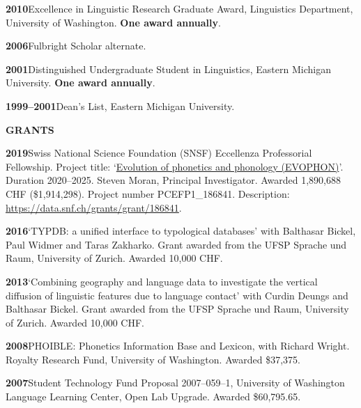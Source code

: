 \documentclass[11pt]{article}
\newcommand{\hangpara}{
 \setlength{\parindent}{0in} %
 \hangindent=0.42in %
}
\begin{document}
\vskip 6pt
\hangpara
{\bf 2010}\hspace{1ex}Excellence in Linguistic Research Graduate Award, Linguistics Department, University of Washington. \textbf{One award annually}.

\vskip 6pt
\hangpara
{\bf 2006}\hspace{1ex}Fulbright Scholar alternate.

\vskip 6pt
\hangpara
{\bf 2001}\hspace{1ex}Distinguished Undergraduate Student in Linguistics, Eastern Michigan University. \textbf{One award annually}.

\vskip 6pt
\hangpara
{\bf 1999--2001}\hspace{1ex}Dean's List, Eastern Michigan University.


\vskip 20pt
\begin{flushleft}
{\bf GRANTS}
\end{flushleft}


\hangpara
{\bf 2019}\hspace{1ex}Swiss National Science Foundation (SNSF) Eccellenza Professorial Fellowship. Project title: `\href{http://p3.snf.ch/project-186841}{Evolution of phonetics and phonology (EVOPHON)}'. Duration 2020--2025. Steven Moran, Principal Investigator. Awarded 1,890,688 CHF (\$1,914,298). Project number PCEFP1\_186841. Description: \url{https://data.snf.ch/grants/grant/186841}.

\vskip 6pt
\hangpara
{\bf 2016}\hspace{1ex}`TYPDB: a unified interface to typological databases' with Balthasar Bickel, Paul Widmer and Taras Zakharko. Grant awarded from the UFSP Sprache und Raum, University of Zurich. Awarded 10,000 CHF.

\vskip 6pt
\hangpara
{\bf 2013}\hspace{1ex}`Combining geography and language data to investigate the vertical diffusion of linguistic features due to language contact' with Curdin Deungs and Balthasar Bickel. Grant awarded from the UFSP Sprache und Raum, University of Zurich. Awarded 10,000 CHF.

\vskip 6pt
\hangpara
{\bf 2008}\hspace{1ex}PHOIBLE: Phonetics Information Base and Lexicon, with Richard Wright. Royalty Research Fund, University of Washington. Awarded \$37,375.

\vskip 6pt
\hangpara
{\bf 2007}\hspace{1ex}Student Technology Fund Proposal 2007--059--1, University of Washington Language Learning Center, Open Lab Upgrade. Awarded \$60,795.65.
\end{document}
